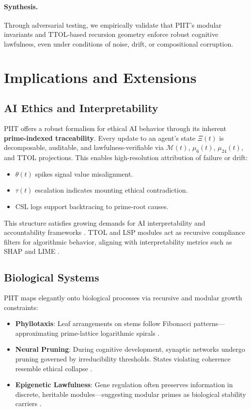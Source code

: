 \documentclass[12pt]{article}
\begin{document}
\paragraph{Synthesis.}
Through adversarial testing, we empirically validate that PIIT’s modular invariants and TTOL-based recursion geometry enforce robust cognitive lawfulness, even under conditions of noise, drift, or compositional corruption.

\section{Implications and Extensions}

\subsection{AI Ethics and Interpretability}

PIIT offers a robust formalism for ethical AI behavior through its inherent \textbf{prime-indexed traceability}. Every update to an agent’s state $\Xi(t)$ is decomposable, auditable, and lawfulness-verifiable via $\mathcal{M}(t)$, $\mu_6(t)$, $\mu_{24}(t)$, and TTOL projections. This enables high-resolution attribution of failure or drift:

\begin{itemize}
    \item $\theta(t)$ spikes signal value misalignment.
    \item $\tau(t)$ escalation indicates mounting ethical contradiction.
    \item CSL logs support backtracing to prime-root causes.
\end{itemize}

This structure satisfies growing demands for AI interpretability and accountability frameworks \cite{doshi2017towards, mittelstadt2019explaining}. TTOL and LSP modules act as recursive compliance filters for algorithmic behavior, aligning with interpretability metrics such as SHAP and LIME \cite{lundberg2017unified}.

\subsection{Biological Systems}

PIIT maps elegantly onto biological processes via recursive and modular growth constraints:

\begin{itemize}
    \item \textbf{Phyllotaxis}: Leaf arrangements on stems follow Fibonacci patterns—approximating prime-lattice logarithmic spirals \cite{jean1994phyllotaxis}.
    \item \textbf{Neural Pruning}: During cognitive development, synaptic networks undergo pruning governed by irreducibility thresholds. States violating coherence resemble ethical collapse \cite{huttenlocher1990synaptic}.
    \item \textbf{Epigenetic Lawfulness}: Gene regulation often preserves information in discrete, heritable modules—suggesting modular primes as biological stability carriers \cite{berger2009epigenetics}.
\end{itemize}
\end{document}
